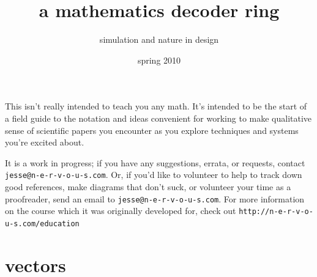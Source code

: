 \documentclass[landscape]{amsart} %
\begin{document}
\title{a mathematics decoder ring}
\author{simulation and nature in design}
\date{spring 2010}


\maketitle


{\Huge This isn't really intended to teach you any math.  It's intended to be the start of a field guide to the notation and ideas convenient for working to make qualitative sense of scientific papers you encounter as you explore techniques and systems you're excited about.

It is a work in progress; if you have any suggestions, errata, or requests, contact \texttt{jesse@n-e-r-v-o-u-s.com}.  Or, if you'd like to volunteer to help to track down good references, make diagrams that don't suck, or volunteer your time as a proofreader, send an email to \texttt{jesse@n-e-r-v-o-u-s.com}.  For more information on the course which it was originally developed for, check out \newline \texttt{http://n-e-r-v-o-u-s.com/education}}



\newpage

\section{vectors}
\end{document}
